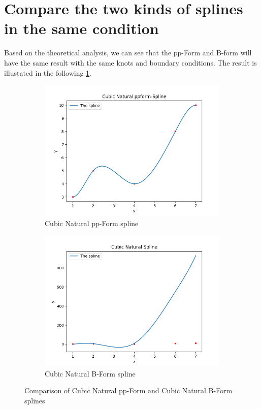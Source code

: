 \documentclass[a4paper]{article}
\begin{document}
\section{Compare the two kinds of splines in the same condition}

Based on the theoretical analysis, we can see that the pp-Form and B-form will have the same result with the same knots and boundary conditions. The result is illustated in the following \cref{fig:compare_spline}.
\begin{figure}[htbp]
  \centering
  \begin{subfigure}[b]{0.45\textwidth}
    \includegraphics[width = \textwidth]{../figure/Cubic Natural ppform-Spline.png}
    \caption{Cubic Natural pp-Form spline}
  \end{subfigure}
  \hfill
  \begin{subfigure}[b]{0.45\textwidth}
    \includegraphics[width = \textwidth]{../figure/Cubic Natural B-Spline.png}
    \caption{Cubic Natural B-Form spline}
  \end{subfigure}
  \caption{Comparison of Cubic Natural pp-Form and Cubic Natural B-Form splines}
  \label{fig:compare_spline}
\end{figure}
\end{document}
